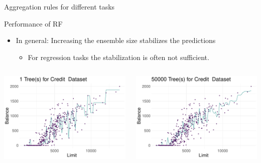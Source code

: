 \documentclass[11pt,compress,t,notes=noshow, xcolor=table]{beamer}
\begin{document}
\begin{vbframe}{Aggregation rules for different tasks}
\end{vbframe}


\begin{vbframe}{Performance of RF}
\begin{itemize}
\item \small In general: Increasing the ensemble size stabilizes the predictions
    \begin{itemize}
        \item \small For regression tasks the stabilization is often not sufficient. 
    \end{itemize}

\end{itemize}
\begin{columns}  
\begin{column}{0.5\textwidth} 
\begin{center}
 \includegraphics[width = 1\textwidth]{figure/nutshell_forest_ensemblesize_1.pdf}
 \end{center}
\end{column}
\begin{column}{0.5\textwidth} 
\begin{center}
  \includegraphics[width = 1\textwidth]{figure/nutshell_forest_ensemblesize_3.pdf}
\end{center}
\end{column}
\end{columns}


\end{vbframe}
\end{document}
